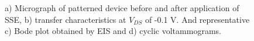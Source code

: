 \begin{figure}[!htb]
    \centering
    \qquad
    \caption[Performance of solid-OECT with photolithographed SSE]{a) Micrograph of patterned device before and after application of SSE, b) transfer characteristics at $V_{DS}$ of -0.1 V. And representative c) Bode plot obtained by EIS and d) cyclic voltammograms.}
    \label{fig:photoSSE}
\end{figure}

